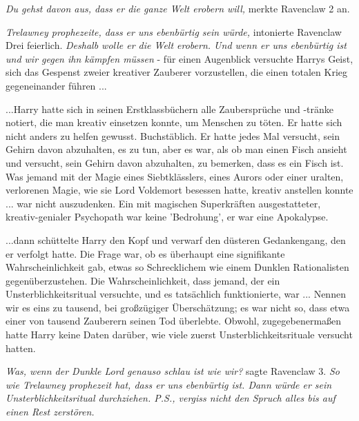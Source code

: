 \emph{Du gehst davon aus, dass er die ganze Welt erobern will,} merkte Ravenclaw
2 an.

\emph{Trelawney prophezeite, dass er uns ebenbürtig sein würde,} intonierte
Ravenclaw Drei feierlich. \emph{Deshalb wolle er die Welt erobern. Und wenn er
uns ebenbürtig ist und wir gegen ihn kämpfen müssen} - für einen Augenblick
versuchte Harrys Geist, sich das Gespenst zweier kreativer Zauberer
vorzustellen, die einen totalen Krieg gegeneinander führen ...

...Harry hatte sich in seinen Erstklassbüchern alle Zaubersprüche und -tränke
notiert, die man kreativ einsetzen konnte, um Menschen zu töten. Er hatte sich
nicht anders zu helfen gewusst. Buchstäblich. Er hatte jedes Mal versucht, sein
Gehirn davon abzuhalten, es zu tun, aber es war, als ob man einen Fisch ansieht
und versucht, sein Gehirn davon abzuhalten, zu bemerken, dass es ein Fisch ist.
Was jemand mit der Magie eines Siebtklässlers, eines Aurors oder einer uralten,
verlorenen Magie, wie sie Lord Voldemort besessen hatte, kreativ anstellen
konnte ... war nicht auszudenken. Ein mit magischen Superkräften ausgestatteter,
kreativ-genialer Psychopath war keine 'Bedrohung', er war eine Apokalypse.

...dann schüttelte Harry den Kopf und verwarf den düsteren Gedankengang, den er
verfolgt hatte. Die Frage war, ob es überhaupt eine signifikante
Wahrscheinlichkeit gab, etwas so Schrecklichem wie einem Dunklen Rationalisten
gegenüberzustehen. Die Wahrscheinlichkeit, dass jemand, der ein
Unsterblichkeitsritual versuchte, und es tatsächlich funktionierte, war ...
Nennen wir es eins zu tausend, bei großzügiger Überschätzung; es war nicht so,
dass etwa einer von tausend Zauberern seinen Tod überlebte. Obwohl,
zugegebenermaßen hatte Harry keine Daten darüber, wie viele zuerst
Unsterblichkeitsrituale versucht hatten.

\emph{Was, wenn der Dunkle Lord genauso schlau ist wie wir?} sagte Ravenclaw 3.
\emph{So wie Trelawney prophezeit hat, dass er uns ebenbürtig ist. Dann würde er
sein Unsterblichkeitsritual durchziehen. P.S., vergiss nicht den Spruch \glqq{}
alles bis auf einen Rest zerstören\grqq{}.}

